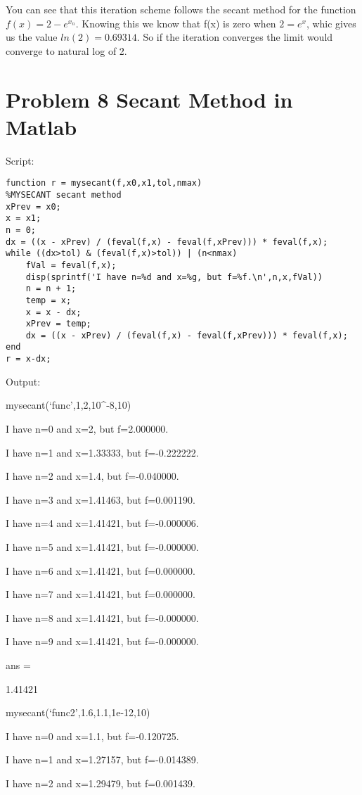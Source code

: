 \documentclass[]{article}
\begin{document}
You can see that this iteration scheme follows the secant method for the
function \(f(x) = 2-e^{x_n}\). Knowing this we know that f(x) is zero
when \(2 = e^x\), whic gives us the value \(ln(2) = 0.69314\). So if the
iteration converges the limit would converge to natural log of 2.

\hypertarget{problem-8-secant-method-in-matlab}{%
\section{Problem 8 Secant Method in
Matlab}\label{problem-8-secant-method-in-matlab}}

Script:

\begin{verbatim}
function r = mysecant(f,x0,x1,tol,nmax)
%MYSECANT secant method
xPrev = x0;
x = x1;
n = 0;
dx = ((x - xPrev) / (feval(f,x) - feval(f,xPrev))) * feval(f,x);
while ((dx>tol) & (feval(f,x)>tol)) | (n<nmax)
    fVal = feval(f,x);
    disp(sprintf('I have n=%d and x=%g, but f=%f.\n',n,x,fVal))
    n = n + 1;
    temp = x;
    x = x - dx;
    xPrev = temp;
    dx = ((x - xPrev) / (feval(f,x) - feval(f,xPrev))) * feval(f,x);
end
r = x-dx;
\end{verbatim}

Output:

mysecant(`func',1,2,10\^{}-8,10)

I have n=0 and x=2, but f=2.000000.

I have n=1 and x=1.33333, but f=-0.222222.

I have n=2 and x=1.4, but f=-0.040000.

I have n=3 and x=1.41463, but f=0.001190.

I have n=4 and x=1.41421, but f=-0.000006.

I have n=5 and x=1.41421, but f=-0.000000.

I have n=6 and x=1.41421, but f=0.000000.

I have n=7 and x=1.41421, but f=0.000000.

I have n=8 and x=1.41421, but f=-0.000000.

I have n=9 and x=1.41421, but f=-0.000000.

ans =

1.41421

mysecant(`func2',1.6,1.1,1e-12,10)

I have n=0 and x=1.1, but f=-0.120725.

I have n=1 and x=1.27157, but f=-0.014389.

I have n=2 and x=1.29479, but f=0.001439.
\end{document}
